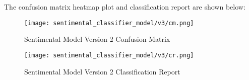 The confusion matrix heatmap plot and classification report are shown below:


\begin{figure}[H]
    \centering
    \texttt{[image: sentimental\_classifier\_model/v3/cm.png]}
    \caption{Sentimental Model Version 2 Confusion Matrix}
    \label{fig:Sentimental Model Version 2 Confusion Matrix}
\end{figure}

\begin{figure}[H]
    \centering
    \texttt{[image: sentimental\_classifier\_model/v3/cr.png]}
    \caption{Sentimental Model Version 2 Classification Report}
    \label{fig:Sentimental Model Version 2 Classification Report}
\end{figure}